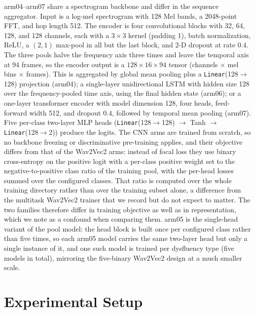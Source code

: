 \documentclass[a4paper,orivec]{llncs}
\begin{document}
arm04--arm07 share a spectrogram backbone and differ in the sequence aggregator.
Input is a log-mel spectrogram with 128 Mel bands, a 2048-point FFT, and hop length
512. The encoder is four convolutional blocks with 32, 64, 128, and 128 channels,
each with a $3\times3$ kernel (padding 1), batch normalization, ReLU, a $(2,1)$
max-pool in all but the last block, and 2-D dropout at rate $0.4$. The three pools
halve the frequency axis three times and leave the temporal axis at 94 frames, so
the encoder output is a $128\times16\times94$ tensor (channels $\times$ mel bins
$\times$ frames). This is aggregated by global mean pooling plus a
\texttt{Linear}(128$\rightarrow$128) projection (arm04); a single-layer
unidirectional LSTM with hidden size 128 over the frequency-pooled time axis, using
the final hidden state (arm06); or a one-layer transformer encoder with model
dimension 128, four heads, feed-forward width 512, and dropout $0.4$, followed by
temporal mean pooling (arm07). Five per-class two-layer MLP heads
(\texttt{Linear}(128$\rightarrow$128) $\rightarrow$ Tanh $\rightarrow$
\texttt{Linear}(128$\rightarrow$2)) produce the logits. The CNN arms are trained
from scratch, so no backbone freezing or discriminative pre-training applies, and
their objective differs from that of the Wav2Vec2 arms: instead of focal loss they
use binary cross-entropy on the positive logit with a per-class positive weight set
to the negative-to-positive class ratio of the training pool, with the per-head
losses summed over the configured classes. That ratio is computed over the whole
training directory rather than over the training subset alone, a difference from
the multitask Wav2Vec2 trainer that we record but do not expect to matter. The two
families therefore differ in training objective as well as in representation, which
we note as a confound when comparing them. arm05 is the single-head variant of the
pool model: the head block is built once per configured class rather than five
times, so each arm05 model carries the same two-layer head but only a single
instance of it, and one such model is trained per dysfluency type (five models in
total), mirroring the five-binary Wav2Vec2 design at a much smaller scale.

\section{Experimental Setup}
\label{sec:setup}
\end{document}
